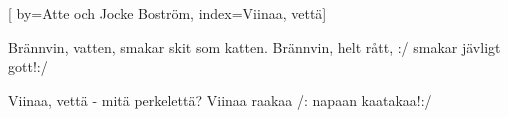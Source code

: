 [ 	
	by={Atte och Jocke Boström},					
	index={Viinaa, vettä}]		
	
\beginverse*						
Brännvin, vatten,
 smakar skit som katten. 
Brännvin, helt rått,
:/ smakar jävligt gott!:/
\endverse
						
\beginverse				
Viinaa, vettä 
- mitä perkelettä? 
Viinaa raakaa 
/: napaan kaatakaa!:/
\endverse			

\vspace{1cm}	
\endsong		
